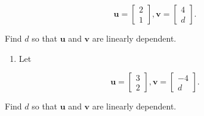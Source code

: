 \documentclass[
]{book}
\providecommand{\tightlist}{%
  \setlength{\itemsep}{0pt}\setlength{\parskip}{0pt}}
\theoremstyle{definition}
\theoremstyle{definition}
\theoremstyle{definition}
\theoremstyle{definition}
\theoremstyle{remark}
\begin{document}
\[\mathbf{u}=\begin{bmatrix} 2\\1\end{bmatrix}, \mathbf{v}=\begin{bmatrix} 4\\ d \end{bmatrix}.\]

Find \(d\) so that \(\mathbf{u}\) and \(\mathbf{v}\) are linearly dependent.

\begin{enumerate}
\def\labelenumi{\arabic{enumi}.}
\setcounter{enumi}{5}
\tightlist
\item
  Let
\end{enumerate}

\[\mathbf{u}=\begin{bmatrix} 3\\2\end{bmatrix}, \mathbf{v}=\begin{bmatrix} -4\\ d \end{bmatrix}.\]

Find \(d\) so that \(\mathbf{u}\) and \(\mathbf{v}\) are linearly dependent.
\end{document}
